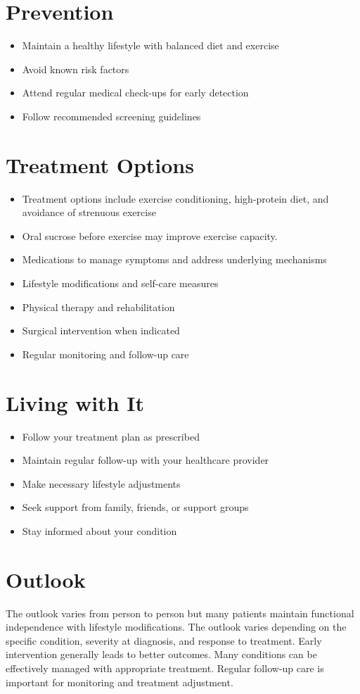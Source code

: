 \section{Prevention}
\begin{itemize}[noitemsep]
  \item Maintain a healthy lifestyle with balanced diet and exercise
  \item Avoid known risk factors
  \item Attend regular medical check-ups for early detection
  \item Follow recommended screening guidelines
\end{itemize}
\section{Treatment Options}
\begin{itemize}[noitemsep]
  \item Treatment options include exercise conditioning, high-protein diet, and avoidance of strenuous exercise
  \item Oral sucrose before exercise may improve exercise capacity.
  \item Medications to manage symptoms and address underlying mechanisms
  \item Lifestyle modifications and self-care measures
  \item Physical therapy and rehabilitation
  \item Surgical intervention when indicated
  \item Regular monitoring and follow-up care
\end{itemize}
\section{Living with It}
\begin{itemize}[noitemsep]
  \item Follow your treatment plan as prescribed
  \item Maintain regular follow-up with your healthcare provider
  \item Make necessary lifestyle adjustments
  \item Seek support from family, friends, or support groups
  \item Stay informed about your condition
\end{itemize}
\section{Outlook}
The outlook varies from person to person but many patients maintain functional independence with lifestyle modifications. The outlook varies depending on the specific condition, severity at diagnosis, and response to treatment. Early intervention generally leads to better outcomes. Many conditions can be effectively managed with appropriate treatment. Regular follow-up care is important for monitoring and treatment adjustment.
